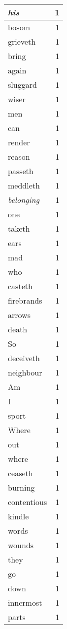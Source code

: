 \begin{center}
\begin{longtable}{l|r}
\emph{his} & 1\\ \hline 
bosom & 1\\ \hline 
grieveth & 1\\ \hline 
bring & 1\\ \hline 
again & 1\\ \hline 
sluggard & 1\\ \hline 
wiser & 1\\ \hline 
men & 1\\ \hline 
can & 1\\ \hline 
render & 1\\ \hline 
reason & 1\\ \hline 
passeth & 1\\ \hline 
meddleth & 1\\ \hline 
\emph{belonging} & 1\\ \hline 
one & 1\\ \hline 
taketh & 1\\ \hline 
ears & 1\\ \hline 
mad & 1\\ \hline 
who & 1\\ \hline 
casteth & 1\\ \hline 
firebrands & 1\\ \hline 
arrows & 1\\ \hline 
death & 1\\ \hline 
So & 1\\ \hline 
deceiveth & 1\\ \hline 
neighbour & 1\\ \hline 
Am & 1\\ \hline 
I & 1\\ \hline 
sport & 1\\ \hline 
Where & 1\\ \hline 
out & 1\\ \hline 
where & 1\\ \hline 
ceaseth & 1\\ \hline 
burning & 1\\ \hline 
contentious & 1\\ \hline 
kindle & 1\\ \hline 
words & 1\\ \hline 
wounds & 1\\ \hline 
they & 1\\ \hline 
go & 1\\ \hline 
down & 1\\ \hline 
innermost & 1\\ \hline 
parts & 1\\ \hline 

\end{longtable}
\end{center}
